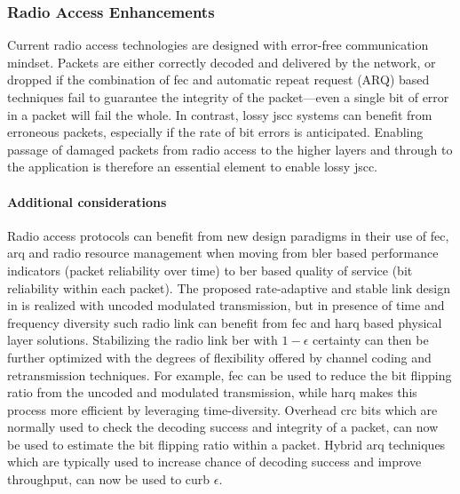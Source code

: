 \subsubsection{Radio Access Enhancements}

Current radio access technologies are designed with error-free communication mindset. Packets are either correctly decoded and delivered by the network, or dropped if the combination of \gls{fec} and automatic repeat request (ARQ) based techniques fail to guarantee the integrity of the packet---even a single bit of error in a packet will fail the whole. In contrast, lossy \gls{jscc} systems can  benefit from erroneous packets, especially if the rate of bit errors is anticipated. Enabling passage of damaged packets from radio access to the higher layers and through to the application is  therefore an essential element to enable lossy \gls{jscc}. 
\paragraph*{Additional considerations} Radio access protocols can benefit from new design paradigms in their use of \gls{fec}, \gls{arq} and radio resource management when moving from \gls{bler} based performance indicators (packet reliability over time) to \gls{ber} based quality of service (bit reliability within each packet). The proposed rate-adaptive and stable link design in  is realized with uncoded modulated transmission, but in presence of time and frequency diversity such radio link can benefit from \gls{fec} and \gls{harq} based physical layer solutions. Stabilizing the radio link \gls{ber} with $1-\epsilon$ certainty can then be further optimized with the degrees of flexibility offered by channel coding and retransmission techniques. For example, \gls{fec} can be used to reduce the bit flipping ratio from the uncoded and modulated transmission, while \gls{harq} makes this process more efficient by leveraging time-diversity. Overhead  \gls{crc} bits which are normally used to check the decoding success and integrity of a packet, can now be used to estimate the bit flipping ratio within a packet. Hybrid \gls{arq} techniques which are typically used to increase chance of decoding success and improve throughput, can now be used to curb $\epsilon$.



